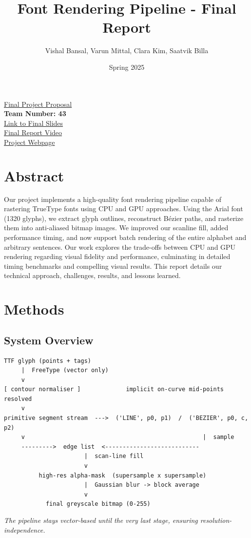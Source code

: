 \documentclass[11pt]{article}
\title{Font Rendering Pipeline - Final Report}
\author{Vishal Bansal, Varun Mittal, Clara Kim, Saatvik Billa}
\date{Spring 2025}
\begin{document}
\doublespacing
\maketitle

\href{https://monstrosity1001.github.io/FInal-Project-Proposal/}{Final Project Proposal} \\

\textbf{Team Number: 43} \\

\href{https://docs.google.com/presentation/d/1kbRLRtB4DUGVzhKq4TOdJPcwAlWVAb9mF2iKYlNwYdU/edit?usp=sharing}{Link to Final Slides}\\

\href{https://drive.google.com/file/d/18JlJTOpAL61NVxUDC-0UwzD6y9mtmdAb/view?usp=sharing}{Final Report Video}\\

\href{https://vbansal-29.github.io/cs184_final/}{Project Webpage}

\tableofcontents
\newpage

\section{Abstract}

Our project implements a high-quality font rendering pipeline capable of rastering TrueType fonts using CPU and GPU approaches. Using the Arial font (1320 glyphs), we extract glyph outlines, reconstruct Bézier paths, and rasterize them into anti-aliased bitmap images. We improved our scanline fill, added performance timing, and now support batch rendering of the entire alphabet and arbitrary sentences. Our work explores the trade-offs between CPU and GPU rendering regarding visual fidelity and performance, culminating in detailed timing benchmarks and compelling visual results. This report details our technical approach, challenges, results, and lessons learned. \par


\newpage
\section{Methods}

\subsection{System Overview}
\begin{verbatim}
TTF glyph (points + tags)
     |  FreeType (vector only)
     v
[ contour normaliser ]             implicit on-curve mid-points resolved
     v
primitive segment stream  --->  ('LINE', p0, p1)  /  ('BEZIER', p0, c, p2)
     v                                                   |  sample
     --------->  edge list  <---------------------------
                       |  scan-line fill
                       v
          high-res alpha-mask  (supersample x supersample)
                       |  Gaussian blur -> block average
                       v
            final greyscale bitmap (0-255)
\end{verbatim}
\textit{The pipeline stays vector-based until the very last stage, ensuring resolution-independence.} \par
\end{document}
